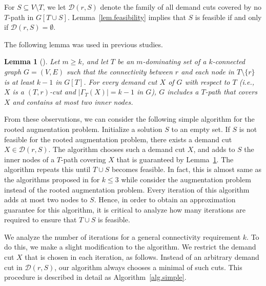 \documentclass[11pt]{article}
\newcommand{\Dfam}{\mathcal{D}}
\newtheorem{lemma}{Lemma}
\begin{document}
  For $S \subseteq V \setminus T$,
  we let $\Dfam(r,S)$ denote
  the family of all demand cuts
   covered by no $T$-path in $G[T \cup S]$.
  Lemma~\ref{lem.feasibility} implies that $S$ is feasible if and only if $\Dfam(r,S)=\emptyset$.



The following lemma was used in previous studies.

\begin{lemma}[\cite{Shang:2007jg,WangKAGLZW13,Wang:2015}]\label{lem.path}
 Let $m \geq k$, and 
 let $T$ be an $m$-dominating set  of a $k$-connected graph $G=(V,E)$
 such that the connectivity between $r$ and each node in $T \setminus \{r\}$
 is at least $k-1$ in $G[T]$.
 For every demand cut $X$ of $G$ with respect to $T$
 (i.e., $X$ is a $(T,r)$-cut and $|\Gamma_T(X)|=k-1$ in $G$), $G$ includes a $T$-path that covers $X$
 and contains at most two inner nodes.
\end{lemma}

  
From these observations, we can consider
the following simple algorithm for the rooted augmentation
problem.
Initialize a solution $S$ to an empty set.
If $S$ is not feasible for the rooted augmentation problem,
there exists a demand cut $X \in \Dfam(r,S)$.
The algorithm 
chooses such a demand cut $X$, and adds to $S$
the inner nodes of a
$T$-path covering $X$ that is guaranteed by
Lemma~\ref{lem.path}.
The algorithm repeats this until $T\cup S$ becomes feasible.
In fact, this is almost same as the algorithms proposed in
\cite{Shang:2007jg,Wang:2015}
for $k\leq 3$ while \cite{Shang:2007jg,Wang:2015} consider
the augmentation problem instead of the rooted augmentation problem.
Every iteration of this algorithm adds at most two nodes to $S$.
Hence,
in order to obtain an approximation guarantee for this algorithm,
it is critical to analyze how many iterations are
required to ensure that $T \cup S$ is feasible.

We analyze the number of iterations for a general connectivity requirement $k$.
To do this, we make a slight modification to the algorithm.
We restrict the demand cut
$X$ that is chosen in each iteration, as follows.
Instead of an arbitrary demand cut in $\Dfam(r,S)$,
our algorithm
always chooses a minimal of such cuts.
This procedure is described in detail as Algorithm~\ref{alg.simple}.
\end{document}
